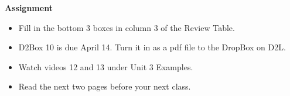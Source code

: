 \begin{center}
  {\large\bf Assignment}
\end{center}

\begin{itemize}
\item Fill in the bottom 3 boxes in column 3 of the Review Table. 
\item D2Box 10 is due April 14.   Turn it in as a pdf file to the
  DropBox on D2L.
\item Watch  videos 12 and 13 under Unit 3 Examples.
\item Read the next two pages before your next class.
\end{itemize}
